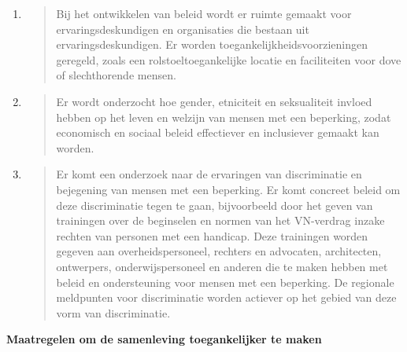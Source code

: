 \begin{enumerate}
\def\labelenumi{\arabic{enumi}.}
\item
  \begin{quote}
  Bij het ontwikkelen van beleid wordt er ruimte gemaakt voor
  ervaringsdeskundigen en organisaties die bestaan uit
  ervaringsdeskundigen. Er worden toegankelijkheidsvoorzieningen
  geregeld, zoals een rolstoeltoegankelijke locatie en faciliteiten voor
  dove of slechthorende mensen.
  \end{quote}
\item
  \begin{quote}
  Er wordt onderzocht hoe gender, etniciteit en seksualiteit invloed
  hebben op het leven en welzijn van mensen met een beperking, zodat
  economisch en sociaal beleid effectiever en inclusiever gemaakt kan
  worden.
  \end{quote}
\item
  \begin{quote}
  Er komt een onderzoek naar de ervaringen van discriminatie en
  bejegening van mensen met een beperking. Er komt concreet beleid om
  deze discriminatie tegen te gaan, bijvoorbeeld door het geven van
  trainingen over de beginselen en normen van het VN-verdrag inzake
  rechten van personen met een handicap. Deze trainingen worden gegeven
  aan overheidspersoneel, rechters en advocaten, architecten,
  ontwerpers, onderwijspersoneel en anderen die te maken hebben met
  beleid en ondersteuning voor mensen met een beperking. De regionale
  meldpunten voor discriminatie worden actiever op het gebied van deze
  vorm van discriminatie.
  \end{quote}
\end{enumerate}

\textbf{Maatregelen om de samenleving toegankelijker te maken}

